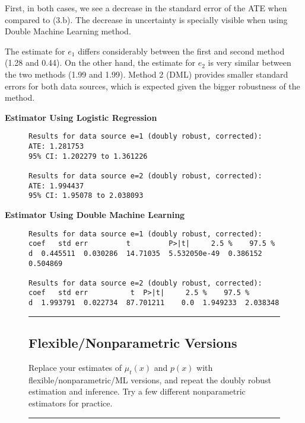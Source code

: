 \documentclass{article}
\newenvironment{colorparagraph}[1]{\par\color{#1}}{\par}
\begin{document}
First, in both cases, we see a decrease in the standard error of the ATE when compared to (3.b). The decrease in uncertainty is specially visible when using Double Machine Learning method.

The estimate for $e_1$ differs considerably between the first and second method (1.28 and 0.44). On the other hand, the estimate for $e_2$ is very similar between the two methods (1.99 and 1.99). Method 2 (DML) provides smaller standard errors for both data sources, which is expected given the bigger robustness of the method.

\textbf{Estimator Using Logistic Regression}

\begin{figure}[H]
  \begin{lstlisting}[style=RstyleComment, caption=Doubly Robust ATE Estimation]
Results for data source e=1 (doubly robust, corrected):
ATE: 1.281753 
95% CI: 1.202279 to 1.361226 

Results for data source e=2 (doubly robust, corrected):
ATE: 1.994437 
95% CI: 1.95078 to 2.038093 
  \end{lstlisting}
\end{figure}

\textbf{Estimator Using Double Machine Learning}

\begin{figure}[H]
\begin{lstlisting}[style=RstyleComment, caption=Doubly Robust ATE Estimation]
Results for data source e=1 (doubly robust, corrected):
coef   std err         t         P>|t|     2.5 %    97.5 %
d  0.445511  0.030286  14.71035  5.532050e-49  0.386152  0.504869

Results for data source e=2 (doubly robust, corrected):
coef   std err          t  P>|t|     2.5 %    97.5 %
d  1.993791  0.022734  87.701211    0.0  1.949233  2.038348
\end{lstlisting}
\end{figure}

\begin{figure}[H]
  \begin{colorparagraph}{questioncolor}
  \rule{\textwidth}{0.5pt}
  \label{q3d}
  \subsection{Flexible/Nonparametric Versions}

  Replace your estimates of \( \mu_t(x) \) and \( p(x) \) with flexible/nonparametric/ML versions, and repeat the doubly robust estimation and inference. Try a few different nonparametric estimators for practice.

  \rule{\textwidth}{0.5pt}
  \end{colorparagraph}
\end{figure}
\end{document}
